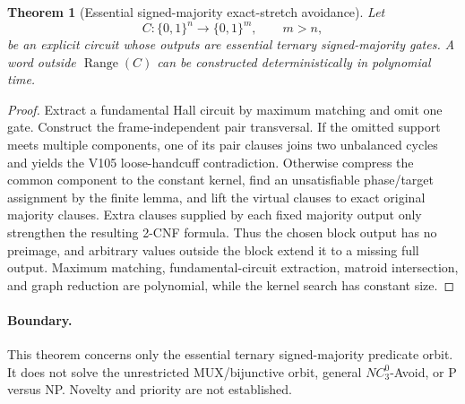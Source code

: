 \documentclass[11pt]{article}
\newtheorem{theorem}{Theorem}
\begin{document}
\begin{theorem}[Essential signed-majority exact-stretch avoidance]
Let
\[
 C:\{0,1\}^n\to\{0,1\}^m,\qquad m>n,
\]
be an explicit circuit whose outputs are essential ternary signed-majority
gates. A word outside $\operatorname{Range}(C)$ can be constructed
deterministically in polynomial time.
\end{theorem}

\begin{proof}
Extract a fundamental Hall circuit by maximum matching and omit one gate.
Construct the frame-independent pair transversal. If the omitted support meets
multiple components, one of its pair clauses joins two unbalanced cycles and
yields the V105 loose-handcuff contradiction. Otherwise compress the common
component to the constant kernel, find an unsatisfiable phase/target assignment
by the finite lemma, and lift the virtual clauses to exact original majority
clauses. Extra clauses supplied by each fixed majority output only strengthen
the resulting 2-CNF formula. Thus the chosen block output has no preimage, and
arbitrary values outside the block extend it to a missing full output. Maximum
matching, fundamental-circuit extraction, matroid intersection, and graph
reduction are polynomial, while the kernel search has constant size.
\end{proof}

\paragraph{Boundary.}
This theorem concerns only the essential ternary signed-majority predicate
orbit. It does not solve the unrestricted MUX/bijunctive orbit, general
$NC^0_3$-Avoid, or P versus NP. Novelty and priority are not established.
\end{document}
